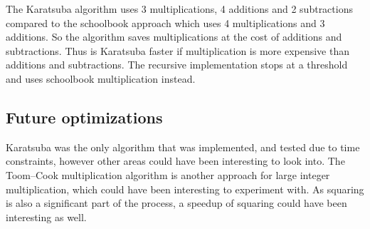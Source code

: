 The Karatsuba algorithm uses 3 multiplications, 4 additions and 2 subtractions compared to the schoolbook approach which uses 4 multiplications and 3 additions. So the algorithm saves multiplications at the cost of additions and subtractions. Thus is Karatsuba faster if multiplication is more expensive than additions and subtractions. The recursive implementation stops at a threshold and uses schoolbook multiplication instead.

\subsection{Future optimizations}
Karatsuba was the only algorithm that was implemented, and tested due to time constraints, however other areas could have been interesting to look into. The Toom–Cook multiplication algorithm is another approach for large integer multiplication, which could have been interesting to experiment with. As squaring is also a significant part of the process, a speedup of squaring could have been interesting as well. \\